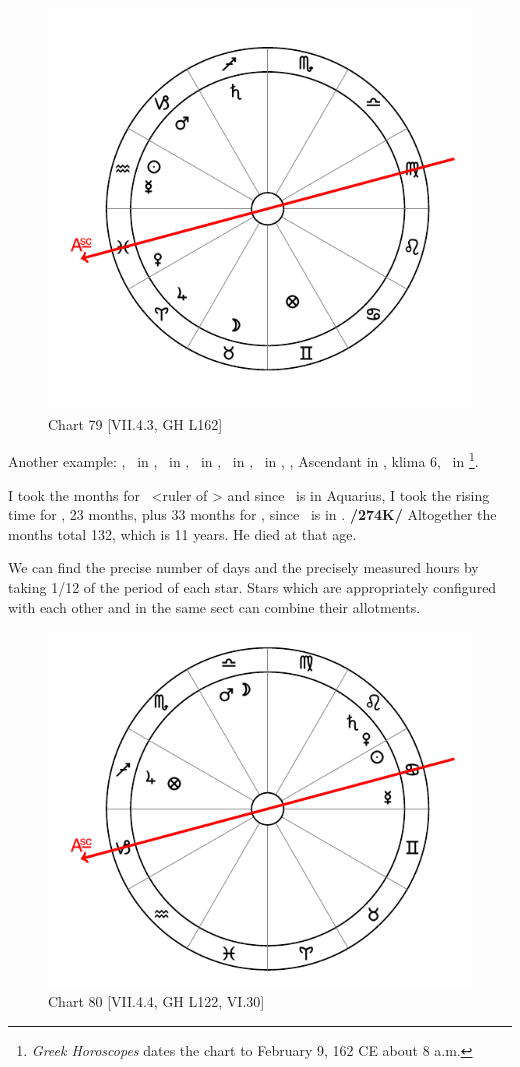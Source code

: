 \newpage
\begin{figure}
\centering
\vspace{-10pt}
\includegraphics[width=.68\textwidth]{charts/7_4_3}
\caption{Chart 79 [VII.4.3, GH L162]}
\label{fig:chart79}
\end{figure} 

Another example: \Sun, \Mercury\, in \Aquarius, \Moon\, in \Taurus, \Saturn\, in \Sagittarius, \Jupiter\, in \Aries,
\Mars\, in \Capricorn, \Venus, Ascendant in \Pisces, klima 6, \Fortune\, in \Gemini\footnote{\textit{Greek Horoscopes} dates the chart to February 9, 162 CE about 8 a.m.}. 

I took the months for \Mercury\, <ruler of \Gemini> and since \Mercury\, is in Aquarius, I took the rising time for \Aquarius, 23 months, plus 33 months for \Sagittarius, since \Saturn\, is in \Sagittarius. \textbf{/274K/} Altogether the months total 132, which is 11 years. He died at that age. 

We can find the precise number of days and the precisely measured hours by taking 1/12 of the period of each star. Stars which are appropriately configured with each other and in the same sect can combine their allotments. 

\newpage
\begin{figure}
\centering
\vspace{-10pt}
\includegraphics[width=.68\textwidth]{charts/7_4_4}
\caption{Chart 80 [VII.4.4, GH L122, VI.30]}
\label{fig:chart80}
\end{figure} 

